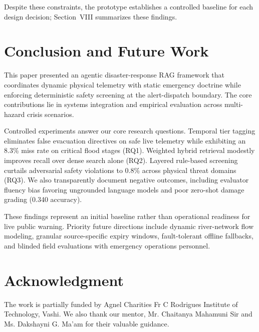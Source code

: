 \documentclass[conference]{IEEEtran}
\begin{document}
Despite these constraints, the prototype establishes a controlled baseline for each design decision; Section~VIII summarizes these findings.

\section{Conclusion and Future Work}
This paper presented an agentic disaster-response RAG framework that coordinates dynamic physical telemetry with static emergency doctrine while enforcing deterministic safety screening at the alert-dispatch boundary. The core contributions lie in systems integration and empirical evaluation across multi-hazard crisis scenarios.

Controlled experiments answer our core research questions. Temporal tier tagging eliminates false evacuation directives on safe live telemetry while exhibiting an 8.3\% miss rate on critical flood stages (RQ1). Weighted hybrid retrieval modestly improves recall over dense search alone (RQ2). Layered rule-based screening curtails adversarial safety violations to 0.8\% across physical threat domains (RQ3). We also transparently document negative outcomes, including evaluator fluency bias favoring ungrounded language models and poor zero-shot damage grading (0.340 accuracy).

These findings represent an initial baseline rather than operational readiness for live public warning. Priority future directions include dynamic river-network flow modeling, granular source-specific expiry windows, fault-tolerant offline fallbacks, and blinded field evaluations with emergency operations personnel.

\section*{Acknowledgment}
The work is partially funded by Agnel Charities Fr C Rodrigues Institute of Technology, Vashi. We also thank our mentor, Mr. Chaitanya Mahamuni Sir and Ms. Dakshayni G. Ma'am for their valuable guidance.
\end{document}

